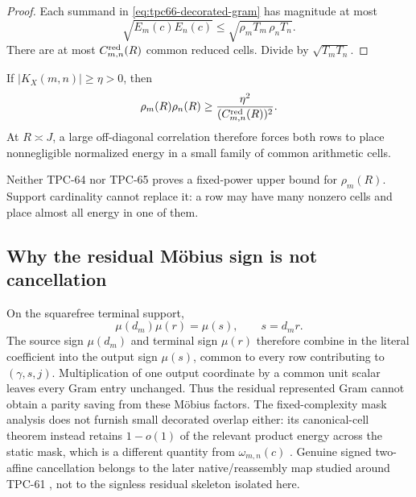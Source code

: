 \begin{proof}
Each summand in \eqref{eq:tpc66-decorated-gram} has magnitude at most
\[
 \sqrt{E_m(c)E_n(c)}
 \le
 \sqrt{\rho_mT_m\,\rho_nT_n}.
\]
There are at most
\(C_{m,n}^{\rm red}(R)\) common reduced cells. Divide by
\(\sqrt{T_mT_n}\).
\end{proof}

\begin{corollary}
If \(|K_X(m,n)|\ge\eta>0\), then
\[
 \rho_m(R)\rho_n(R)
 \ge\frac{\eta^2}{(C_{m,n}^{\rm red}(R))^2}.
\]
At \(R\asymp J\), a large off-diagonal correlation therefore forces both rows
to place nonnegligible normalized energy in a small family of common
arithmetic cells.
\end{corollary}

Neither TPC-64 nor TPC-65 proves a fixed-power upper bound for \(\rho_m(R)\).
Support cardinality cannot replace it: a row may have many nonzero cells and
place almost all energy in one of them.

\subsection{Why the residual M\"obius sign is not cancellation}
On the squarefree terminal support,
\[
 \mu(d_m)\mu(r)=\mu(s),\qquad s=d_mr.
\]
The source sign \(\mu(d_m)\) and terminal sign \(\mu(r)\) therefore combine
in the literal coefficient into the output sign \(\mu(s)\), common to every
row contributing to \((\gamma,s,j)\).
Multiplication of one output coordinate by a common unit scalar leaves every
Gram entry unchanged. Thus the residual represented Gram cannot obtain a
parity saving from these M\"obius factors. The fixed-complexity mask analysis
does not furnish small decorated overlap either: its canonical-cell theorem
instead retains \(1-o(1)\) of the relevant product energy across the static
mask, which is a different quantity from
\(\omega_{m,n}(c)\) \citep{WangTPC50}. Genuine signed two-affine
cancellation belongs to the later native/reassembly map studied around
TPC-61 \citep{WangTPC61}, not to the signless residual skeleton isolated
here.
